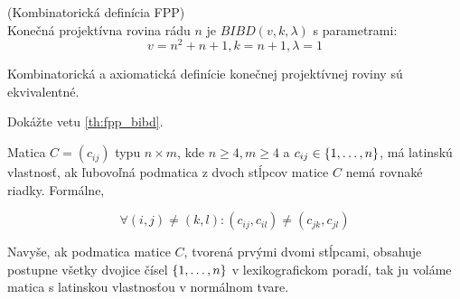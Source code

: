 \begin{definition}{(Kombinatorická definícia FPP)}\\
Konečná projektívna rovina rádu $n$ je $BIBD(v, k, \lambda)$ s parametrami:
$$v = n^2 + n + 1, k = n + 1, \lambda = 1$$
\end{definition}

\begin{theorem}
\label{th:fpp_bibd}
Kombinatorická a axiomatická definície konečnej projektívnej roviny sú ekvivalentné. 
\end{theorem}


\begin{exercise}
Dokážte vetu \ref{th:fpp_bibd}.
\end{exercise}

\begin{definition}
Matica $C = (c_{ij})$ typu $n \times m$, kde $n \geq 4, m \geq 4$ a $c_{ij} \in \left\{1, \ldots, n\right\}$,  
má latinskú vlastnosť, ak ľubovoľná podmatica z dvoch stĺpcov matice $C$ nemá rovnaké riadky. Formálne,

$$\forall (i, j) \neq (k, l): (c_{ij}, c_{il}) \neq (c_{jk}, c_{jl})$$

Navyše, ak podmatica matice $C$, tvorená prvými dvomi stĺpcami, obsahuje postupne všetky dvojice čísel $\left\{1, \ldots, n\right\}$
v lexikografickom poradí, tak ju voláme matica s latinskou vlastnosťou v normálnom tvare.
\end{definition}

